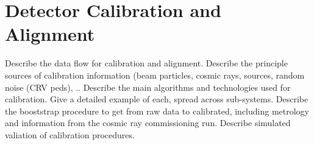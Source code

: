 \section{Detector Calibration and Alignment}
\label{sec:calibration}

Describe the data flow for calibration and alignment.
Describe the principle sources of calibration information (beam particles, cosmic rays, sources, random noise (CRV peds), ..
Describe the main algorithms and technologies used for calibration.
Give a detailed example of each, spread across sub-systems.
Describe the booststrap procedure to get from raw data to calibrated, including metrology and information from the cosmic ray commissioning run.
Describe simulated valiation of calibration procedures.



